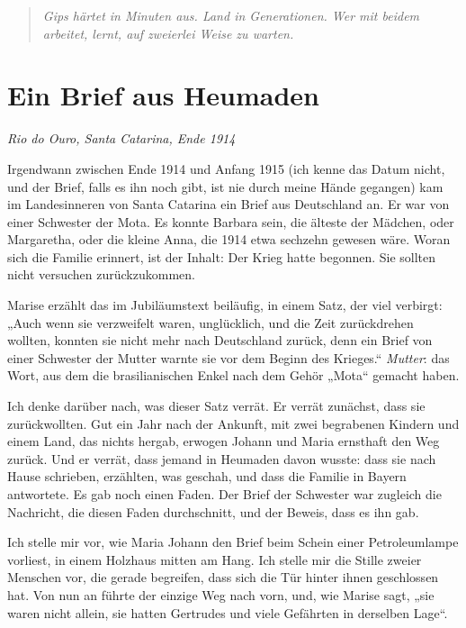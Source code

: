 \documentclass[
  ngerman,
  11pt,
  openany]{book}
\begin{document}
\begin{quote}
\emph{Gips härtet in Minuten aus. Land in Generationen. Wer mit beidem
arbeitet, lernt, auf zweierlei Weise zu warten.}
\end{quote}

\section{Ein Brief aus Heumaden}\label{ein-brief-aus-heumaden}

\emph{Rio do Ouro, Santa Catarina, Ende 1914}

Irgendwann zwischen Ende 1914 und Anfang 1915 (ich kenne das Datum
nicht, und der Brief, falls es ihn noch gibt, ist nie durch meine Hände
gegangen) kam im Landesinneren von Santa Catarina ein Brief aus
Deutschland an. Er war von einer Schwester der Mota. Es konnte Barbara
sein, die älteste der Mädchen, oder Margaretha, oder die kleine Anna,
die 1914 etwa sechzehn gewesen wäre. Woran sich die Familie erinnert,
ist der Inhalt: Der Krieg hatte begonnen. Sie sollten nicht versuchen
zurückzukommen.

Marise erzählt das im Jubiläumstext beiläufig, in einem Satz, der viel
verbirgt: „Auch wenn sie verzweifelt waren, unglücklich, und die Zeit
zurückdrehen wollten, konnten sie nicht mehr nach Deutschland zurück,
denn ein Brief von einer Schwester der Mutter warnte sie vor dem Beginn
des Krieges.`` \emph{Mutter}: das Wort, aus dem die brasilianischen
Enkel nach dem Gehör „Mota`` gemacht haben.

Ich denke darüber nach, was dieser Satz verrät. Er verrät zunächst, dass
sie zurückwollten. Gut ein Jahr nach der Ankunft, mit zwei begrabenen
Kindern und einem Land, das nichts hergab, erwogen Johann und Maria
ernsthaft den Weg zurück. Und er verrät, dass jemand in Heumaden davon
wusste: dass sie nach Hause schrieben, erzählten, was geschah, und dass
die Familie in Bayern antwortete. Es gab noch einen Faden. Der Brief der
Schwester war zugleich die Nachricht, die diesen Faden durchschnitt, und
der Beweis, dass es ihn gab.

Ich stelle mir vor, wie Maria Johann den Brief beim Schein einer
Petroleumlampe vorliest, in einem Holzhaus mitten am Hang. Ich stelle
mir die Stille zweier Menschen vor, die gerade begreifen, dass sich die
Tür hinter ihnen geschlossen hat. Von nun an führte der einzige Weg nach
vorn, und, wie Marise sagt, „sie waren nicht allein, sie hatten
Gertrudes und viele Gefährten in derselben Lage``.
\end{document}
